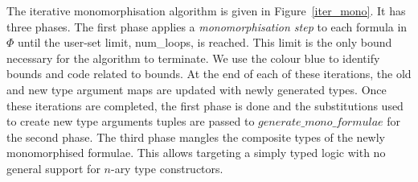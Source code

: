 \documentclass[]{ceurart}
\begin{document}
The iterative monomorphisation algorithm is given in Figure~\ref{iter_mono}. It has three phases. The first phase applies a \emph{monomorphisation step} to each formula in \(\Phi\) until the user-set limit, \textcolor{ourblueviolet}{num\_loops}, is reached. This limit is the only bound necessary for the algorithm to terminate. We use the colour blue to identify bounds and code related to bounds. At the end of each of these iterations, the old and new type argument maps are updated with newly generated types. Once these iterations are completed, the first phase is done and the substitutions used to create new type arguments tuples are passed to $\mathit{generate\_mono\_formulae}$ for the second phase. The third phase mangles the composite types of the newly monomorphised formulae. This allows targeting a simply typed logic with no general support for $n$-ary type constructors.
\end{document}
